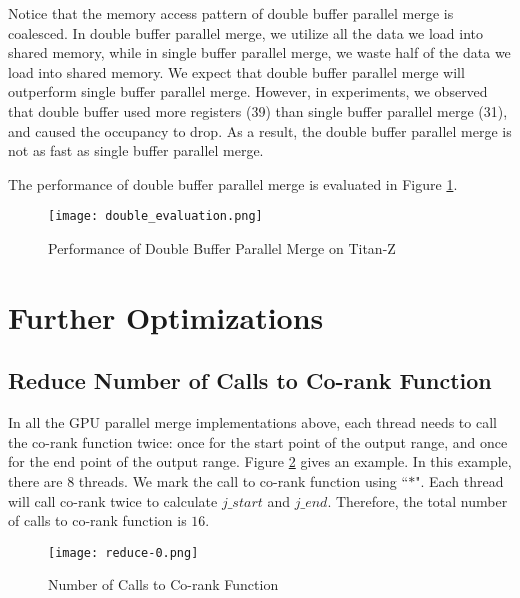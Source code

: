    Notice that the memory access pattern of double buffer parallel merge is coalesced. 
    In double buffer parallel merge, we utilize all the 
    data we load into shared memory, while in single buffer parallel merge, we waste half of 
    the data we load into shared memory. We expect that double buffer parallel merge will 
    outperform single buffer parallel merge. However, in experiments, we observed that double 
    buffer used more registers (39) than single buffer parallel merge (31), and caused the occupancy 
    to drop. As a result, the double buffer parallel merge is not as fast as single buffer parallel
    merge. 

    The performance of double buffer parallel merge is evaluated in Figure \ref{fig:double_evaluation}.

    \begin{figure}[!h]
    \begin{center}
    \texttt{[image: double\_evaluation.png]}
    \end{center}
    \caption{{\label{fig:double_evaluation}} Performance of Double Buffer Parallel Merge on Titan-Z}
    \end{figure}

%   
%

    \section{Further Optimizations}\label{sect:opt}
        \subsection{Reduce Number of Calls to Co-rank Function}\label{sect:opt:co-rank}
        In all the GPU parallel merge implementations above, each thread needs to call the co-rank 
        function twice: once for the start point of the output range, and once for the end point 
        of the output range. Figure \ref{fig:reduce-0} gives an example. In this example, there 
        are $8$ threads. We mark the call to co-rank function using ``$*$". 
        Each thread will call co-rank twice to calculate $j\_start$ and $j\_end$.
        Therefore, the total number of calls to co-rank function is $16$.  

        \begin{figure}[!h]
        \begin{center}
        \texttt{[image: reduce-0.png]}
        \end{center}
        \caption{{\label{fig:reduce-0}} Number of Calls to Co-rank Function}
        \end{figure}

